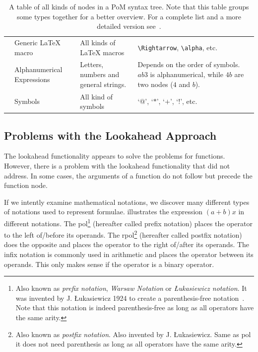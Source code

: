 \documentclass[a4paper,11pt]{article}
\newcommand{\tbs}{\textbackslash}
\theoremstyle{defTheoStyle}
\theoremstyle{defExampStyle}
\begin{document}
\begin{table}[t!]
\begin{tabularx}{\textwidth}{Y{1.55cm} Y{2.5cm} L L}
	 & Generic \LaTeX{} macro & All kinds of \LaTeX{} macros & \texttt{\tbs Rightarrow}, \texttt{\tbs alpha}, etc.\\
	 & Alphanumerical Expressions & Letters, numbers and general strings. & Depends on the order of symbols. $ab3$ is alphanumerical, while $4b$ are two nodes ($4$ and $b$).\\
	 & Symbols & All kind of symbols & `$@$', `$*$', `$+$', `$!$', etc.\\
	\hline
\end{tabularx}
\caption{A table of all kinds of nodes in a PoM syntax tree. Note that this table groups some types together for a better overview. For a complete list and a more detailed version see~\parencite{POM-Tagger}.}
\label{tab:allTypesTable}
\end{table} 

\subsection{Problems with the Lookahead Approach}
The lookahead functionality appears to solve the problems for functions. However, there is a problem with the lookahead functionality that  did not address. In some cases, the arguments of a function do not follow but precede the function node. 

If we intently examine mathematical notations, we discover many different types of notations used to represent formulae.  illustrates the expression $(a+b)x$ in different notations. The \gls*{pol}\footnote{Also known as \textit{prefix notation}, \textit{Warsaw Notation} or \textit{{\L}ukasiewicz notation}. It was invented by J. {\L}ukasiewicz 1924 to create a parenthesis-free notation~\parencite{Hamblin1962}. Note that this notation is indeed parenthesis-free as long as all operators have the same arity.} (hereafter called prefix notation) places the operator to the left of/before its operands. The \gls*{rpol}\footnote{Also known as \textit{postfix notation}. Also invented by J. {\L}ukasiewicz. Same as \gls*{pol} it does not need parenthesis as long as all operators have the same arity.} (hereafter called postfix notation) does the opposite and places the operator to the right of/after its operands. The infix notation is commonly used in arithmetic and places the operator between its operands. This only makes sense if the operator is a binary operator.
\end{document}
